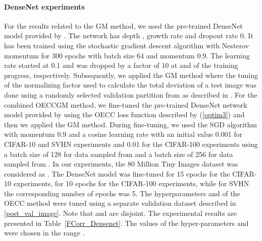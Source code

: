 \documentclass{article} \usepackage{iclr2020_conference,times}
\begin{document}
\paragraph{DenseNet experiments} For the results related to the GM method, we used the pre-trained DenseNet \citep{huang2017densely} model provided by \citet{2017arXiv170602690L}. The network has depth , growth rate  and dropout rate 0. It has been trained using the stochastic gradient descent algorithm with Nesterov momentum \citep{Duchi:2011:ASM:1953048.2021068, kingma2014adam} for 300 epochs with batch size 64 and momentum 0.9. The learning rate started at 0.1 and was dropped by a factor of 10 at  and  of the training progress, respectively. Subsequently, we applied the GM method \citep{ch2019detecting} where the tuning of the normalizing factor used to calculate the total deviation of a test image was done using a randomly selected validation partition from  as described in \citet{ch2019detecting}. For the combined OECCGM method, we fine-tuned the pre-trained DenseNet network model provided by \citet{2017arXiv170602690L} using the OECC loss function described by (\ref{optim3}) and then we applied the GM method. During fine-tuning, we used the SGD algorithm with momentum 0.9 and a cosine learning rate \citep{loshchilov-ICLR17SGDR} with an initial value 0.001 for CIFAR-10 and SVHN experiments and 0.01 for the CIFAR-100 experiments using a batch size of 128 for data sampled from  and a batch size of 256 for data sampled from . In our experiments, the 80 Million Tiny Images dataset \citep{Torralba:2008:MTI:1444381.1444403} was considered as . The DenseNet model was fine-tuned for 15 epochs for the CIFAR-10 experiments, for 10 epochs for the CIFAR-100 experiments, while for SVHN the corresponding number of epochs was 5. The hyperparameters  and  of the OECC method were tuned using a separate validation dataset  described in \ref{post_val_image}. Note that  and  are disjoint. The experimental results are presented in Table~\ref{FCorr_Densenet}. The values of the hyper-parameters  and  were chosen in the range .
\end{document}
